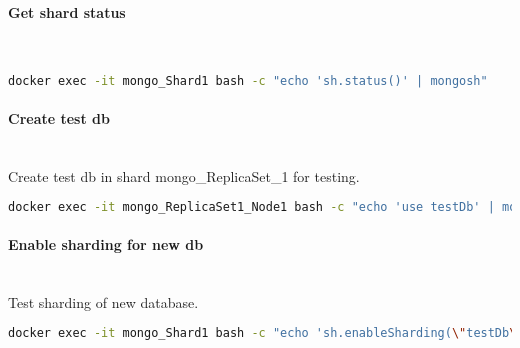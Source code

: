 \paragraph{Get shard status}\mbox{}\\
\begin{lstlisting}[language=Bash, caption=Get shard status]
docker exec -it mongo_Shard1 bash -c "echo 'sh.status()' | mongosh"
\end{lstlisting}

\paragraph{Create test db}\mbox{}\\
Create test db in shard mongo{\_}ReplicaSet{\_}1 for testing.
\begin{lstlisting}[language=Bash, caption=Create test db]
docker exec -it mongo_ReplicaSet1_Node1 bash -c "echo 'use testDb' | mongosh"
\end{lstlisting}

\paragraph{Enable sharding for new db}\mbox{}\\
Test sharding of new database.
\begin{lstlisting}[language=Bash, caption=Enable sharding for new db]
docker exec -it mongo_Shard1 bash -c "echo 'sh.enableSharding(\"testDb\")' | mongosh"
\end{lstlisting}


